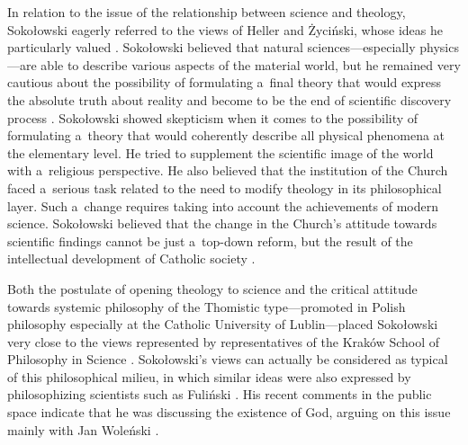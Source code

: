 \documentclass[%
  manuscript=article,
  year=2024,
  volume=77,
  doi=10.59203/zfn.77.689,
]{zfn}
\begin{document}
In relation to the issue of the relationship between science and theology, Sokołowski eagerly referred to the views of Heller and Życiński, whose ideas he particularly valued 
\parencites[see,][]{Sokoowski1993Koscio}[][p.187]{Sokoowski2014Czy}. %
 Sokołowski believed that natural sciences---especially physics---are able to describe various aspects of the material world, but he remained very cautious about the possibility of formulating a~final theory that would express the absolute truth about reality and become to be the end of scientific discovery process 
\parencite[][]{Sokoowski2011O}. %
 Sokołowski showed skepticism when it comes to the possibility of formulating a~theory that would coherently describe all physical phenomena at the elementary level. He tried to supplement the scientific image of the world with a~religious perspective. He also believed that the institution of the Church faced a~serious task related to the need to modify theology in its philosophical layer. Such a~change requires taking into account the achievements of modern science. Sokołowski believed that the change in the Church's attitude towards scientific findings cannot be just a~top-down reform, but the result of the intellectual development of Catholic society 
\parencite[][p.123]{Sokoowski1993Koscio}.%




Both the postulate of opening theology to science and the critical attitude towards systemic philosophy of the Thomistic type---promoted in Polish philosophy especially at the Catholic University of Lublin---placed Sokołowski very close to the views represented by representatives of the Kraków School of Philosophy in Science 
\parencites[see e.g.,][pp.228–229]{Trombik2021Koncepcje}[][]{Trombik2022Teologia}. %
 Sokołowski's views can actually be considered as typical of this philosophical milieu, in which similar ideas were also expressed by philosophizing scientists such as Fuliński 
\parencite[][]{Trombik2023Andrzej}. %
 His recent comments in the public space indicate that he was discussing the existence of God, arguing on this issue mainly with Jan Woleński 
\parencite[][]{Sokoowski2024Polscy}.%
\end{document}
